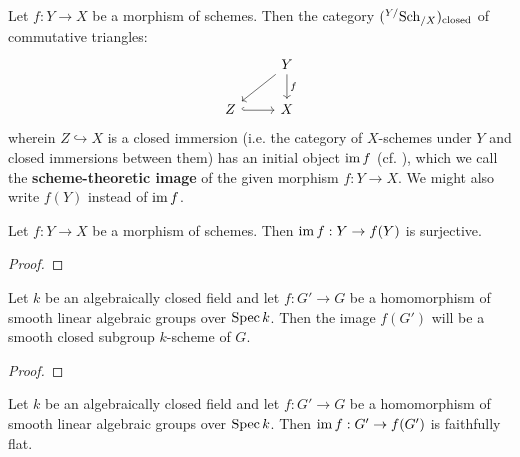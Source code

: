         \begin{definition} \label{def: scheeme_theoretic_images}
            Let $f: Y \to X$ be a morphism of schemes. Then the category $({}^{Y/}\mathrm{Sch}_{/X})_{\mathrm{closed}}$ of commutative triangles:
                $$
                    \begin{tikzcd}
                        & Y \\
                        Z & X
                        \arrow["f", from=1-2, to=2-2]
                        \arrow["", hook, from=2-1, to=2-2]
                        \arrow[""', from=1-2, to=2-1]
                    \end{tikzcd}
                $$
            wherein $Z \hookrightarrow X$ is a closed immersion (i.e. the category of $X$-schemes under $Y$ and closed immersions between them) has an initial object $\operatorname{im} f$ (cf. \cite[\href{https://stacks.math.columbia.edu/tag/01R6}{Tag 01R6}]{stacks-project}), which we call the \textbf{scheme-theoretic image} of the given morphism $f: Y \to X$. We might also write $f(Y)$ instead of $\operatorname{im} f$.
        \end{definition}
        \begin{proposition} \label{prop: morphisms_surject_onto_images}
            Let $f: Y \to X$ be a morphism of schemes. Then $\operatorname{im} f: Y \to f(Y)$ is surjective.
        \end{proposition}
            \begin{proof}
                
            \end{proof}
        \begin{lemma} \label{lemma: the_closed_orbit_lemma}
            Let $k$ be an algebraically closed field and let $f: G' \to G$ be a homomorphism of smooth linear algebraic groups over $\operatorname{Spec} k$. Then the image $f(G')$ will be a smooth closed subgroup $k$-scheme of $G$.
        \end{lemma}
            \begin{proof}
                
            \end{proof}
        \begin{proposition} \label{prop: surjections_onto_images_of_linear_algebraic_group_homomorphisms_are_faithfully_flat}
            Let $k$ be an algebraically closed field and let $f: G' \to G$ be a homomorphism of smooth linear algebraic groups over $\operatorname{Spec} k$. Then $\operatorname{im} f: G' \to f(G')$ is faithfully flat. 
        \end{proposition}
